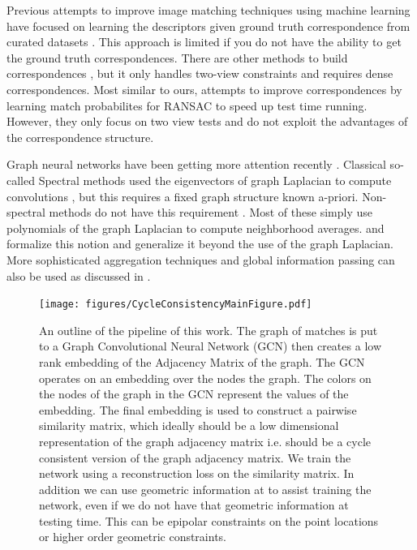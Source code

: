 \documentclass[10pt,twocolumn,letterpaper]{article}
\begin{document}
Previous attempts to improve image matching techniques using machine learning have focused on learning the descriptors given ground truth correspondence from curated datasets \cite{zagoruyko2015learning, yi2016lift, brachmann2017dsac}. This approach is limited if you do not have the ability to get the ground truth correspondences.
There are other methods to build correspondences \cite{choy2016universal}, but it only handles two-view constraints and requires dense correspondences.
Most similar to ours, \cite{yi2018learning} attempts to improve correspondences by learning match probabilites for RANSAC to speed up test time running. However, they only focus on two view tests and do not exploit the advantages of the correspondence structure.

Graph neural networks have been getting more attention recently 
\cite{bronstein2017geometric, bruna2013spectral, defferrard2016convolutional, kipf2016semi, scarselli2009graph, gama2018mimo, gama2018convolutional, battaglia2018relational}.
Classical so-called Spectral methods used the eigenvectors of graph Laplacian to compute convolutions \cite{bronstein2017geometric}, but this requires a fixed graph structure known a-priori.  
Non-spectral methods do not have this requirement \cite{bronstein2017geometric, kipf2016semi, scarselli2009graph, gama2018convolutional}. Most of these simply use polynomials of the graph Laplacian to compute neighborhood averages. \cite{gama2018mimo} and \cite{gama2018convolutional} formalize this notion and generalize it beyond the use of the graph Laplacian. More sophisticated aggregation techniques and global information passing can also be used as discussed in \cite{battaglia2018relational}.

\begin{figure}[t]
\begin{center}
  \texttt{[image: figures/CycleConsistencyMainFigure.pdf]}
\end{center}
  \caption{
    An outline of the pipeline of this work.
    The graph of matches is put to a Graph Convolutional Neural Network (GCN) \cite{kipf2016semi} then creates a low rank embedding of the Adjacency Matrix of the graph.
    The GCN operates on an embedding over the nodes the graph.
    The colors on the nodes of the graph in the GCN represent the values of the embedding.
    The final embedding is used to construct a pairwise similarity matrix, which ideally should be a low dimensional representation of the graph adjacency matrix i.e. should be a cycle consistent version of the graph adjacency matrix.
    We train the network using a reconstruction loss on the similarity matrix.
    In addition we can use geometric information at to assist training the network, even if we do not have that geometric information at testing time.
    This can be epipolar constraints on the point locations or higher order geometric constraints.
  }
\label{fig:pipeline}
\label{fig:onecol}
\end{figure}
\end{document}
